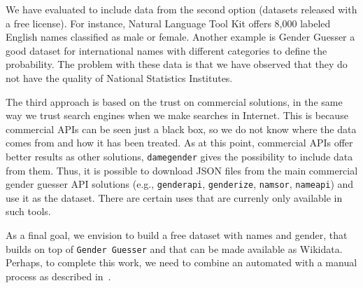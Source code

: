\documentclass[a4paper]{article}
\begin{document}
We have evaluated to include data from the second option (datasets released with a free license). 
For instance, Natural Language Tool Kit offers 8,000 labeled English names classified as male or female. 
Another example is Gender Guesser a good dataset for international names with different categories to define the probability. 
The problem with these data is that we have observed that they do not have the quality of National Statistics Institutes. 


The third approach is based on the trust on commercial solutions, in the same way we trust search engines when we make searches in Internet.
This is because commercial APIs can be seen just a black box, so we do not know where the data comes from and how it has been treated.
As at this point, commercial APIs offer better results as other solutions, \texttt{damegender} gives the possibility to include data from them.
Thus, it is possible to download JSON files from the main commercial gender guesser API solutions (e.g., \texttt{genderapi}, \texttt{genderize}, \texttt{namsor}, \texttt{nameapi}) and use it as the dataset.
There are certain uses that are currenly only available in such tools.


As a final goal, we envision to build a free dataset with names and gender, that builds on top of \texttt{Gender Guesser} and that can be made available as Wikidata. 
Perhaps, to complete this work, we need to combine an automated with a manual process as described in~\cite{10.7717/peerj-cs.156}.
\end{document}
